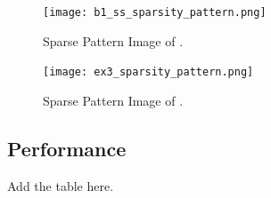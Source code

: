 \documentclass[12pt]{article}
\begin{document}
\begin{figure}[h]
  \centering
  \texttt{[image: b1\_ss\_sparsity\_pattern.png]}
  \caption{Sparse Pattern Image of .}
  \label{fig:your_image}
\end{figure}

\begin{figure}[h]
  \centering
  \texttt{[image: ex3\_sparsity\_pattern.png]}
  \caption{Sparse Pattern Image of .}
  \label{fig:your_image}
\end{figure}

\subsection{Performance}

Add the table here.
\end{document}
